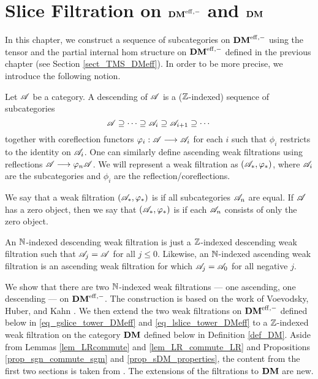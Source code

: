 \newpage
\chapter{Slice Filtration on $\mathbf{DM}^{\mathrm{eff},-}$ and $\mathbf{DM}$}\label{sect_slice_filt_dm}

In this chapter, we construct a sequence of subcategories on 
$\mathbf{DM}^{\mathrm{eff},-}$ using the tensor and the partial internal hom structure 
on $\mathbf{DM}^{\mathrm{eff},-}$ defined in the previous chapter (see Section 
\ref{sect_TMS_DMeff}). In order to be more precise, we introduce
the following notion.

\begin{defn}\label{def_cat_filtration}
Let $\mathscr{A}$ be a category. A descending  of 
$\mathscr{A}$ is a ($\mathbb{Z}$-indexed) sequence of subcategories
\[
\mathscr{A} \supseteq \cdots \supseteq \mathscr{A}_i \supseteq \mathscr{A}_{i + 1}
   \supseteq \cdots
\]
together with coreflection functors $\varphi_i: \mathscr{A} \longrightarrow \mathscr{A}_i$
for each $i$ such that $\phi_i$ restricts to the identity on
$\mathscr{A}_i$. One can similarly define ascending weak filtrations using
reflections $\mathscr{A} \longrightarrow \varphi_n\mathscr{A}$. We will represent a weak
filtration as $(\mathscr{A}_*, \varphi_*)$, where $\mathscr{A}_i$ are the
subcategories and $\phi_i$ are the reflection/coreflections.

We say that a weak filtration $(\mathscr{A}_*, \varphi_*)$ is 
 if all subcategories $\mathscr{A}_n$ are equal. If
$\mathscr{A}$ has a zero object, then we say that $(\mathscr{A}_*, \varphi_*)$
is  if each $\mathscr{A}_n$ consists of only the zero object.
\end{defn}

\begin{rmk}
An $\mathbb{N}$-indexed descending weak filtration is just a $\mathbb{Z}$-indexed 
descending weak filtration such that $\mathscr{A}_j = \mathscr{A}$
for all $j \leq 0$. Likewise, an $\mathbb{N}$-indexed ascending 
weak filtration is an ascending weak filtration for which
$\mathscr{A}_j = \mathscr{A}_0$ for all negative $j$.
\end{rmk}

We show that there are two $\mathbb{N}$-indexed weak filtrations --- one
ascending, one descending --- on $\mathbf{DM}^{\mathrm{eff},-}$. The construction is based
on the work of Voevodsky, Huber, and Kahn \cite{HuKa}.  We then extend
the two weak filtrations on $\mathbf{DM}^{\mathrm{eff},-}$ defined below in
\eqref{eq_gslice_tower_DMeff} and \eqref{eq_lslice_tower_DMeff} to a
$\mathbb{Z}$-indexed weak filtration on the category $\mathbf{DM}$ defined below in
Definition \ref{def_DM}. Aside from Lemmas \ref{lem_LRcommute} and
\ref{lem_LR_commute_LR} and Propositions \ref{prop_sgn_commute_sgm}
and \ref{prop_sDM_properties}, the content from the first two sections
is taken from \cite[\S 1]{HuKa}. The extensions of the filtrations to
$\mathbf{DM}$ are new.

